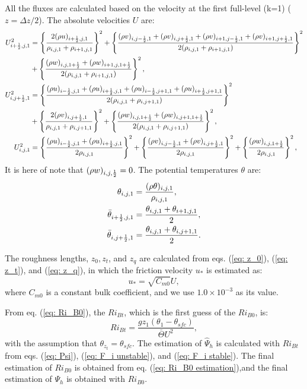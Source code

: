 All the fluxes are calculated based on the velocity at the first full-level (k=1)
($z=\Delta z/2$).
The absolute velocities $U$ are:
\begin{align}
  U_{i+\frac{1}{2},j,1}^2 &=
    \left\{\frac{2(\rho u)_{i+\frac{1}{2},j,1}}{\rho_{i,j,1}+\rho_{i+1,j,1}}\right\}^2
  + \left\{\frac{(\rho v)_{i,j-\frac{1}{2},1} + (\rho v)_{i,j+\frac{1}{2},1} + (\rho v)_{i+1,j-\frac{1}{2},1} + (\rho v)_{i+1,j+\frac{1}{2},1}}{2(\rho_{i,j,1}+\rho_{i+1,j,1})}\right\}^2 \nonumber \\
 &+ \left\{\frac{(\rho w)_{i,j,1+\frac{1}{2}} + (\rho w)_{i+1,j,1+\frac{1}{2}}}{2(\rho_{i,j,1}+\rho_{i+1,j,1})}\right\}^2, \\
  U_{i,j+\frac{1}{2},1}^2 &=
    \left\{\frac{(\rho u)_{i-\frac{1}{2},j,1} + (\rho u)_{i+\frac{1}{2},j,1} + (\rho u)_{i-\frac{1}{2},j+1,1} + (\rho u)_{i+\frac{1}{2},j+1,1}}{2(\rho_{i,j,1}+\rho_{i,j+1,1})}\right\}^2 \nonumber\\
 &+ \left\{\frac{2(\rho v)_{i,j+\frac{1}{2},1}}{\rho_{i,j,1}+\rho_{i,j+1,1}}\right\}^2
  + \left\{\frac{(\rho w)_{i,j,1+\frac{1}{2}} + (\rho w)_{i,j+1,1+\frac{1}{2}}}{2(\rho_{i,j,1}+\rho_{i,j+1,1})}\right\}^2, \\
  U_{i,j,1}^2 &=
    \left\{\frac{(\rho u)_{i-\frac{1}{2},j,1} + (\rho u)_{i+\frac{1}{2},j,1}}{2\rho_{i,j,1}}\right\}^2
  + \left\{\frac{(\rho v)_{i,j-\frac{1}{2},1} + (\rho v)_{i,j+\frac{1}{2},1}}{2\rho_{i,j,1}}\right\}^2
  + \left\{\frac{(\rho w)_{i,j,1+\frac{1}{2}}}{2\rho_{i,j,1}}\right\}^2,
\end{align}
It is here of note that $(\rho w)_{i,j,\frac{1}{2}}=0$.
The potential temperatures $\theta$ are:
\begin{align}
  \theta_{i,j,1} &= \frac{(\rho \theta)_{i,j,1}}{\rho_{i,j,1}}, \\
  \bar{\theta}_{i+\frac{1}{2},j,1} &= \frac{\theta_{i,j,1}+\theta_{i+1,j,1}}{2}, \\
  \bar{\theta}_{i,j+\frac{1}{2},1} &= \frac{\theta_{i,j,1}+\theta_{i,j+1,1}}{2}.
\end{align}

The roughness lengths, $z_0, z_t$, and $z_q$ are calculated from
eqs. (\ref{eq: z_0}), (\ref{eq: z_t}), and (\ref{eq: z_q}),
in which the friction velocity $u_*$ is estimated as:
\begin{equation}
  u_* = \sqrt{C_{m0}} U,
\end{equation}
where $C_{m0}$ is a constant bulk coefficient,
and we use $1.0 \times 10^{-3}$ as its value.

From eq. (\ref{eq: Ri_B0}), the $Ri_{Bt}$, which is the first guess of the $Ri_{B0}$, is:
\begin{equation}
  Ri_{Bt} = \frac{gz_1(\theta_1-\theta_{sfc})}{\bar{\Theta}U^2},
\end{equation}
with the assumption that $\theta_{z_t} = \theta_{sfc}$.
The estimation of $\hat{\Psi}_h$ is calculated with $Ri_{Bt}$ from
eqs. (\ref{eq: Psi}), (\ref{eq: F_i unstable}), and (\ref{eq: F_i stable}).
The final estimation of $Ri_{B0}$ is obtained from eq. (\ref{eq: Ri_B0 estimation}),and the final estimation of $\Psi_h$ is obtained with $Ri_{B0}$.

